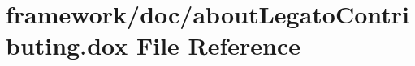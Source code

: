 \hypertarget{about_legato_contributing_8dox}{}\section{framework/doc/about\+Legato\+Contributing.dox File Reference}
\label{about_legato_contributing_8dox}
